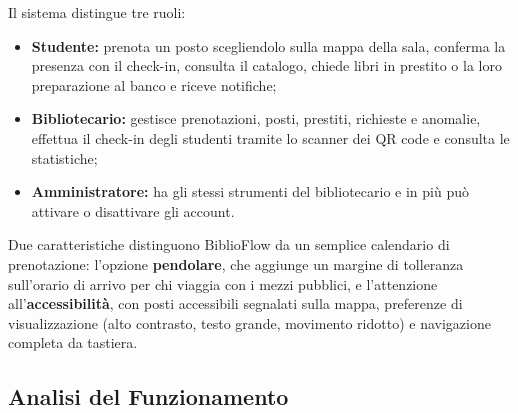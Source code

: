 \documentclass[11pt,a4paper,oneside,openany]{book}
\begin{document}
Il sistema distingue tre ruoli:
\begin{itemize}
  \item \textbf{Studente:} prenota un posto scegliendolo sulla mappa della
        sala, conferma la presenza con il check-in, consulta il catalogo,
        chiede libri in prestito o la loro preparazione al banco e riceve
        notifiche;
  \item \textbf{Bibliotecario:} gestisce prenotazioni, posti, prestiti,
        richieste e anomalie, effettua il check-in degli studenti tramite lo
        scanner dei QR code e consulta le statistiche;
  \item \textbf{Amministratore:} ha gli stessi strumenti del bibliotecario e
        in più può attivare o disattivare gli account.
\end{itemize}

Due caratteristiche distinguono BiblioFlow da un semplice calendario di
prenotazione: l'opzione \textbf{pendolare}, che aggiunge un margine di
tolleranza sull'orario di arrivo per chi viaggia con i mezzi pubblici, e
l'attenzione all'\textbf{accessibilità}, con posti accessibili segnalati sulla
mappa, preferenze di visualizzazione (alto contrasto, testo grande, movimento
ridotto) e navigazione completa da tastiera.

\subsection{Analisi del Funzionamento}
\end{document}
